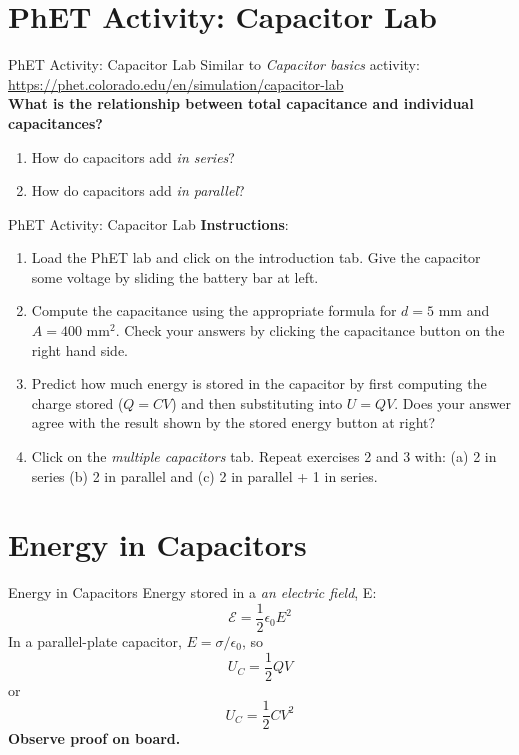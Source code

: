 \documentclass{beamer}
\begin{document}
\section{PhET Activity: Capacitor Lab}

\begin{frame}{PhET Activity: Capacitor Lab}
Similar to \textit{Capacitor basics} activity: \\ \vspace{0.5cm}
\url{https://phet.colorado.edu/en/simulation/capacitor-lab} \\ \vspace{0.5cm}
\textbf{What is the relationship between total capacitance and individual capacitances?}
\begin{enumerate}
\item How do capacitors add \textit{in series}?
\item How do capacitors add \textit{in parallel}?
\end{enumerate}
\end{frame}

\begin{frame}{PhET Activity: Capacitor Lab}
\small
\textbf{Instructions}:
\begin{enumerate}
\item Load the PhET lab and click on the introduction tab.  Give the capacitor some voltage by sliding the battery bar at left.
\item Compute the capacitance using the appropriate formula for $d=5$ mm and $A=400$ mm$^2$.  Check your answers by clicking the capacitance button on the right hand side.
\item Predict how much energy is stored in the capacitor by first computing the charge stored ($Q = CV$) and then substituting into $U = QV$.  Does your answer agree with the result shown by the stored energy button at right?
\item Click on the \textit{multiple capacitors} tab.  Repeat exercises 2 and 3 with: (a) 2 in series (b) 2 in parallel and (c) 2 in parallel + 1 in series.
\end{enumerate}
\end{frame}

\section{Energy in Capacitors}

\begin{frame}{Energy in Capacitors}
Energy stored in a \textit{an electric field}, E:
\begin{equation}
\mathcal{E} = \frac{1}{2} \epsilon_0 E^2
\end{equation}
In a parallel-plate capacitor, $E=\sigma/\epsilon_0$, so 
\begin{equation}
U_C = \frac{1}{2} Q V
\end{equation}
or
\begin{equation}
U_C = \frac{1}{2}CV^2
\end{equation}
\textbf{Observe proof on board.}
\end{frame}
\end{document}
